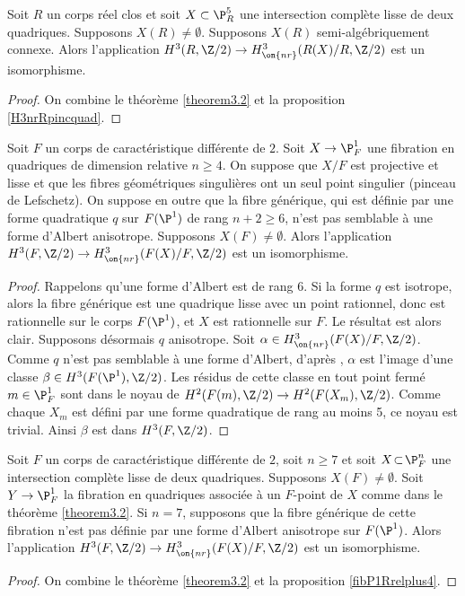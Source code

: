\begin{cor}\label{H3Rnrdeuxquad}
Soit $R$ un corps réel clos et soit $X \subset \P^5_{R}$ une intersection complète lisse de deux quadriques. Supposons $X(R) \neq \emptyset$. Supposons $X(R)$ semi-algébriquement connexe.
Alors l'application $ H^3(R, \Z/2) \to H^3_{\on{nr}}(R(X)/R, \Z/2)$
est un isomorphisme.
\end{cor}

\begin{proof}
On combine le théorème \ref{theorem3.2} et la proposition \ref{H3nrRpincquad}.
\end{proof}

\begin{prop}\label{fibP1Rrelplus4}
Soit $F$ un corps de caractéristique différente de $2$.
Soit $X\to \P^1_{F}$ une fibration en quadriques de dimension relative $n\geq 4$.
On suppose que $X/F$ est projective et lisse
et que les fibres géométriques singulières ont un seul point singulier
(pinceau de Lefschetz).
On suppose en outre que la fibre générique, qui est définie par
une forme quadratique $q$ sur $F(\P^1)$ de rang $n+2\geq 6 $,
n'est pas semblable à une forme d'Albert anisotrope.
Supposons $X(F)\neq \emptyset$.
Alors l'application $H^3(F,\Z/2) \to H^3_{\on{nr}}(F(X)/F, \Z/2)$ est
un isomorphisme.
\end{prop}

\begin{proof}
Rappelons qu'une forme d'Albert est de rang $6$. Si la forme $q$ est isotrope, alors la fibre générique est une quadrique lisse avec un point rationnel, donc est rationnelle sur le corps $F(\P^1)$,
et $X$ est rationnelle sur $F$. Le résultat est alors clair. Supposons désormais $q$ anisotrope.
Soit $\alpha \in H^3_{\on{nr}}(F(X)/F, \Z/2)$. Comme $q$
n'est pas semblable à une forme d'Albert, d'après
\cite[Th.\,5]{kahn1998unramified},
$\alpha$ est l'image d'une classe $\beta \in H^3(F(\P^1),\Z/2)$.
Les résidus de cette classe en tout point fermé $m \in \P^1_F$
sont dans le noyau de $H^2(F(m), \Z/2) \to H^2(F(X_{m}), \Z/2)$.
Comme chaque $X_{m}$ est défini par une forme quadratique de rang au moins 5,
ce noyau est trivial. Ainsi $\beta$ est dans $H^3(F,\Z/2)$.
\end{proof}

\begin{cor}\label{2quadsurFngeq7}
Soit $F$ un corps de caractéristique différente de $2$, soit \hbox{$n\!\geq\! 7$} et soit $X \!\subset\! \P^n_F$ une intersection complète lisse de deux quadriques. Supposons \hbox{$X(F) \!\neq\! \emptyset$}.
Soit $Y \to \P^1_F$ la fibration en quadriques associée à un $F$-point de $X$ comme dans le théorème \ref{theorem3.2}.
Si $n=7$, supposons que la fibre générique de cette fibration n'est pas définie par une forme d'Albert anisotrope sur $F(\P^1)$. Alors l'application $H^3(F,\Z/2) \to H^3_{\on{nr}}(F(X)/F, \Z/2)$ est un isomorphisme.
\end{cor}
\begin{proof}
On combine le théorème \ref{theorem3.2} et la proposition \ref{fibP1Rrelplus4}.
\end{proof}

